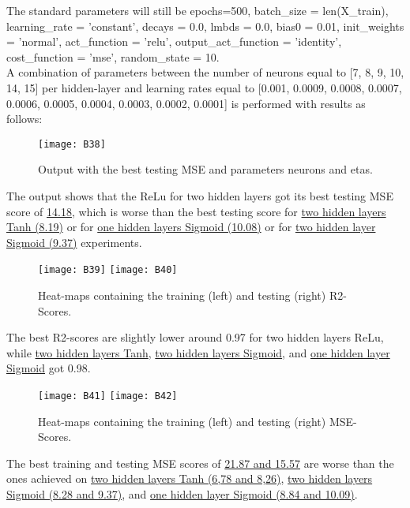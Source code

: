 The standard parameters will still be epochs=500, batch\_size = len(X\_train), learning\_rate = 'constant', decays = 0.0, lmbds = 0.0, bias0 = 0.01, init\_weights = 'normal', act\_function = 'relu', output\_act\_function = 'identity', cost\_function = 'mse', random\_state = 10.\\

A combination of parameters between the number of neurons equal to [7, 8, 9, 10, 14, 15] per hidden-layer and learning rates equal to [0.001, 0.0009, 0.0008, 0.0007, 0.0006, 0.0005, 0.0004, 0.0003, 0.0002, 0.0001] is performed with results as follows:

\begin{figure}[H]
\label{fig:B25}
\centering
\texttt{[image: B38]}
\caption{Output with the best testing MSE and parameters neurons and etas.}
\end{figure}

The output shows that the ReLu for two hidden layers got its best testing MSE score of \hyperref[fig:B18]{14.18}, which is worse than the best testing score for \hyperref[fig:B18]{two hidden layers Tanh (8.19)} or for \hyperref[fig:B1]{one hidden layers Sigmoid (10.08)} or for \hyperref[fig:B10]{two hidden layer Sigmoid (9.37)} experiments.

\begin{figure}[H]
\label{fig:B26}
\centering
\texttt{[image: B39]}
\texttt{[image: B40]}
\caption{Heat-maps containing the training (left) and testing (right) R2-Scores.}
\end{figure}

The best R2-scores are slightly lower around 0.97 for two hidden layers ReLu, while \hyperref[fig:B19]{two hidden layers Tanh}, \hyperref[fig:B11]{two hidden layers Sigmoid}, and \hyperref[fig:B2]{one hidden layer Sigmoid} got 0.98.

\begin{figure}[H]
\label{fig:B27}
\centering
\texttt{[image: B41]}
\texttt{[image: B42]}
\caption{Heat-maps containing the training (left) and testing (right) MSE-Scores.}
\end{figure}

The best training and testing MSE scores of \hyperref[fig:B20]{21.87 and 15.57} are worse than the ones achieved on \hyperref[fig:B20]{two hidden layers Tanh (6,78 and 8,26)}, \hyperref[fig:B12]{two hidden layers Sigmoid (8.28 and 9.37)}, and \hyperref[fig:B3]{one hidden layer Sigmoid (8.84 and 10.09)}.

